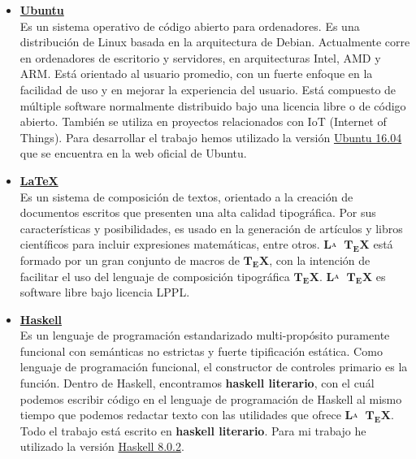 \begin{itemize}

\item \href{https://www.ubuntu.com/}{\textbf{Ubuntu}}\\
Es un sistema operativo de código abierto para ordenadores. Es una distribución de Linux basada en la arquitectura de Debian. Actualmente corre en ordenadores de escritorio y servidores, en arquitecturas Intel, AMD y ARM. Está orientado al usuario promedio, con un fuerte enfoque en la facilidad de uso y en mejorar la experiencia del usuario. Está compuesto de múltiple software normalmente distribuido bajo una licencia libre o de código abierto. También se utiliza en proyectos relacionados con IoT (Internet of Things). Para desarrollar el trabajo hemos utilizado la versión \href{https://www.ubuntu.com/download/alternative-downloads}{Ubuntu 16.04} que se encuentra en la web oficial de Ubuntu. 

\item \href{https://www.latex-project.org/}{\textbf{LaTeX}}  \\
Es un sistema de composición de textos, orientado a la creación de documentos escritos que presenten una alta calidad tipográfica. Por sus características y posibilidades, es usado en la generación de artículos y libros científicos para incluir expresiones matemáticas, entre otros.  $\mathbf{L\!\!^{{}_{\scriptstyle A}} \!\!\!\!\!\;\; T\!_{\displaystyle E} \! X}$ está formado por un gran conjunto de macros de  $\mathbf{T\!_{\displaystyle E} \! X}$, con la intención de facilitar el uso del lenguaje de composición tipográfica ${\displaystyle \mathbf {T\!_{\displaystyle E}\!X} }$. $\mathbf{L\!\!^{{}_{\scriptstyle A}} \!\!\!\!\!\;\; T\!_{\displaystyle E} \! X}$ es software libre bajo licencia LPPL. 

\item \href{https://www.haskell.org/}{\textbf{Haskell}}\\
Es un lenguaje de programación estandarizado multi-propósito puramente funcional con semánticas no estrictas y fuerte tipificación estática. Como lenguaje de programación funcional, el constructor de controles primario es la función. Dentro de Haskell, encontramos \textbf{haskell literario}, con el cuál podemos escribir código en el lenguaje de programación de Haskell al mismo tiempo que podemos redactar texto con las utilidades que ofrece $\mathbf{L\!\!^{{}_{\scriptstyle A}} \!\!\!\!\!\;\; T\!_{\displaystyle E} \! X}$. Todo el trabajo está escrito en  \textbf{haskell literario}. Para mi trabajo he utilizado la versión \href{https://www.haskell.org/ghc/download_ghc_8_0_2.html}{Haskell 8.0.2}.


\end{itemize}

